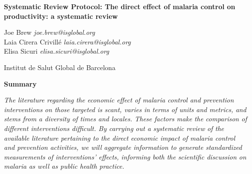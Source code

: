 \documentclass{article}
\begin{document}


\vspace{20mm}


\begin{Huge}
\begin{center}
\textbf{Systematic Review Protocol: The direct effect of malaria control on productivity: a systematic review}
\end{center}
\end{Huge}



\vspace{5mm}

\begin{changemargin}{2.5cm}{2.5cm} 
\begin{center}
\begin{large}
Joe Brew \hfill \emph{joe.brew@isglobal.org} \\
Laia Cirera Crivillé \hfill \emph{laia.cirera@isglobal.org} \\ 
Elisa Sicuri \hfill \emph{elisa.sicuri@isglobal.org} \\ 
\end{large}
\end{center}
\end{changemargin}


\vspace{6mm}

\begin{center}
\begin{large}
Institut de Salut Global de Barcelona 
\end{large}
\end{center}


\begin{changemargin}{3cm}{3cm} 

\begin{center}
\textbf{Summary}
\end{center}

\emph{The literature regarding the economic effect of malaria control and prevention interventions on those targeted is scant, varies in terms of units and metrics, and stems from a diversity of times and locales. These factors make the comparison of different interventions difficult. By carrying out a systematic review of the available literature pertaining to the direct economic impact of malaria control and prevention activities, we will aggregate information to generate standardized measurements of interventions' effects, informing both the scientific discussion on malaria as well as public health practice.}

\end{changemargin}
\end{document}
